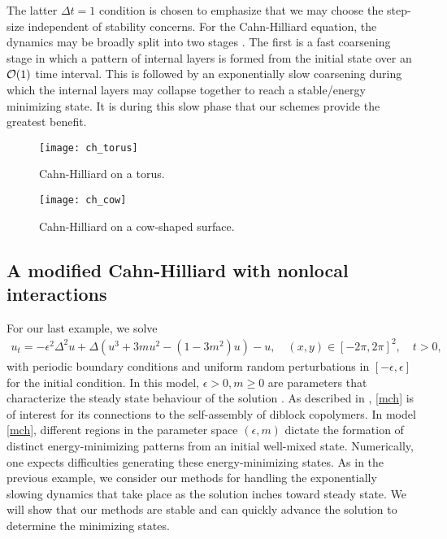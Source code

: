 The latter $\Delta t =1$ condition is chosen to emphasize that we may choose the step-size independent of stability concerns. For the Cahn-Hilliard equation, the dynamics may be broadly split into two stages \cite{sun2000dynamics}. The first is a fast coarsening stage in which a pattern of internal layers is formed from the initial state over an $\mathcal{O}(1)$ time interval. This is followed by an exponentially slow coarsening during which the internal layers may collapse together to reach a stable/energy minimizing state. It is during this slow phase that our schemes provide the greatest benefit. 

\begin{figure}[htb!]
	\centering
\texttt{[image: ch\_torus]}
\caption[Cahn-Hilliard on a torus.]{Cahn-Hilliard on a torus.}
\label{fig:ch torus}
\end{figure}
\begin{figure}[htb!]
	\centering
\texttt{[image: ch\_cow]}
\caption[Cahn-Hilliard on a cow-shaped surface.]{Cahn-Hilliard on a cow-shaped surface.}
\label{fig:ch cow}
\end{figure}

\subsection{A modified Cahn-Hilliard with nonlocal interactions}
For our last example, we solve 
\begin{align}
        u_t = -\epsilon^2 \Delta^2 u + \Delta (u^3 + 3mu^2 - (1-3m^2)u) - u, 
\quad (x,y)\in[-2\pi,2\pi]^2,
\quad t>0,
\label{mch}
\end{align}
with periodic boundary conditions and uniform random perturbations in $[-\epsilon,\epsilon]$ for the initial condition. In this model, $\epsilon>0, m\geq 0$ are parameters that characterize the steady state behaviour of the solution \cite{choksi2009phase,choksi20112d}. As described in \cite{choksi2009phase}, \cref{mch} is of interest for its connections to the self-assembly of diblock copolymers. In model \cref{mch}, different regions in the parameter space $(\epsilon, m)$ dictate the formation of distinct energy-minimizing patterns from an initial well-mixed state. Numerically, one expects difficulties generating these energy-minimizing states. As in the previous example, we consider our methods for handling the exponentially slowing dynamics that take place as the solution inches toward steady state. We will show that our methods are stable and can quickly advance the solution to determine the minimizing states. 

